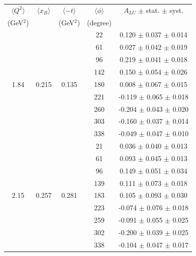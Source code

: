\documentclass{article}
\begin{document}
\begin{table}[!h]
   \begin{center}
      \begin{tabular}{|c|c|c|c|c|}
         \hline
 $\langle Q^{2} \rangle$ & $\langle x_{B} \rangle$ & $\langle -t \rangle$ & $\langle \phi \rangle$ & $A_{LU}$ $\pm$ stat. $\pm$ syst.\\
 (GeV$^{2}$) &           & (GeV$^{2}$) & (degree) &  \\
  \hline
        &       &        &   22    &  0.120   $\pm$  0.037  $\pm$ 0.014  \\ 
        &       &        &   61    &  0.027   $\pm$  0.042  $\pm$ 0.019  \\ 
        &       &        &   96    &  0.219   $\pm$  0.041  $\pm$ 0.018  \\ 
        &       &        &  142    &  0.150   $\pm$  0.054  $\pm$ 0.026  \\ 
  1.84  & 0.215 & 0.135  &  180    &  0.008   $\pm$  0.067  $\pm$ 0.015  \\ 
        &       &        &  221    & -0.119   $\pm$  0.065  $\pm$ 0.018  \\ 
        &       &        &  260    & -0.204   $\pm$  0.043  $\pm$ 0.020  \\ 
        &       &        &  303    & -0.160   $\pm$  0.037  $\pm$ 0.014  \\ 
        &       &        &  338    & -0.049   $\pm$  0.047  $\pm$ 0.010  \\ 
  \hline 
        &       &        &   21    &  0.036   $\pm$  0.040  $\pm$ 0.013  \\
        &       &        &   61    &  0.093   $\pm$  0.045  $\pm$ 0.013  \\
        &       &        &   96    &  0.149   $\pm$  0.051  $\pm$ 0.034  \\
        &       &        &  139    &  0.111   $\pm$  0.073  $\pm$ 0.018  \\
  2.15  & 0.257 & 0.281  &  183    &  0.105   $\pm$  0.093  $\pm$ 0.030  \\
        &       &        &  223    & -0.074   $\pm$  0.076  $\pm$ 0.018  \\
        &       &        &  259    & -0.091   $\pm$  0.055  $\pm$ 0.025  \\
        &       &        &  302    & -0.200   $\pm$  0.039  $\pm$ 0.025  \\
        &       &        &  338    & -0.104   $\pm$  0.047  $\pm$ 0.017  \\
  \hline 

\end{tabular}
\end{center}
\end{table}
\end{document}
